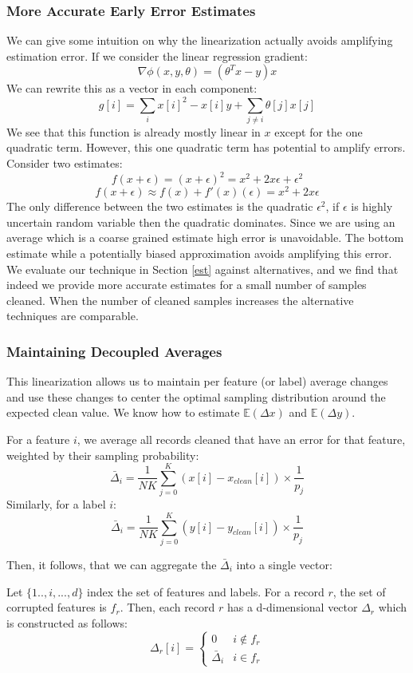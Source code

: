 \subsubsection{More Accurate Early Error Estimates}\label{acc}
We can give some intuition on why the linearization actually avoids amplifying estimation error.
If we consider the linear regression gradient:
\[
\nabla\phi(x,y,\theta) = (\theta^Tx - y)x
\]
We can rewrite this as a vector in each component:
\[
g[i] = \sum_{i} x[i]^2-x[i]y + \sum_{j \ne i} \theta[j]x[j]
\]
We see that this function is already mostly linear in $x$ except for the one quadratic term.
However, this one quadratic term has potential to amplify errors.
Consider two estimates:
\[
f(x+\epsilon) = (x+\epsilon)^2 = x^2 + 2x\epsilon + \epsilon^2
\]
\[
f(x+\epsilon) \approx f(x) + f'(x)(\epsilon) = x^2 + 2x\epsilon
\]
The only difference between the two estimates is the quadratic $\epsilon^2$, if $\epsilon$ is highly uncertain random variable then the quadratic dominates.
Since we are using an average which is a coarse grained estimate high error is unavoidable.
The bottom estimate while a potentially biased approximation avoids amplifying this error.
We evaluate our technique in Section \ref{est} against alternatives, and we find that indeed we provide more accurate estimates for a small number of samples cleaned.
When the number of cleaned samples increases the alternative techniques are comparable.

\subsubsection{Maintaining Decoupled Averages}
This linearization allows us to maintain per feature (or label) average changes and use these changes to center the optimal sampling distribution around the expected clean value.
We know how to estimate $\mathbb{E}(\Delta x)$ and $\mathbb{E}(\Delta y)$.
\begin{lemma}
For a feature $i$, we average all records cleaned that have an error for that feature, weighted by their sampling probability:
\[
\bar{\Delta}_i = \frac{1}{NK}\sum_{j=0}^K (x[i]-x_{clean}[i])\times \frac{1}{p_j}
\]
Similarly, for a label $i$:
\[
\bar{\Delta}_i = \frac{1}{NK}\sum_{j=0}^K (y[i]-y_{clean}[i])\times \frac{1}{p_j}
\]
\end{lemma}

Then, it follows, that we can aggregate the $\bar{\Delta}_i$ into a single vector:
\begin{lemma}
Let $\{1..,i,...,d\}$ index the set of features and labels.
For a record $r$, the set of corrupted features is $f_r$.
Then, each record $r$ has a d-dimensional vector $\Delta_r$ which is constructed as follows:
\[
 \Delta_r[i] = \begin{cases} 0 & i \notin f_r \\ 
\bar{\Delta}_i & i \in f_r
\end{cases} 
\]
\end{lemma}

